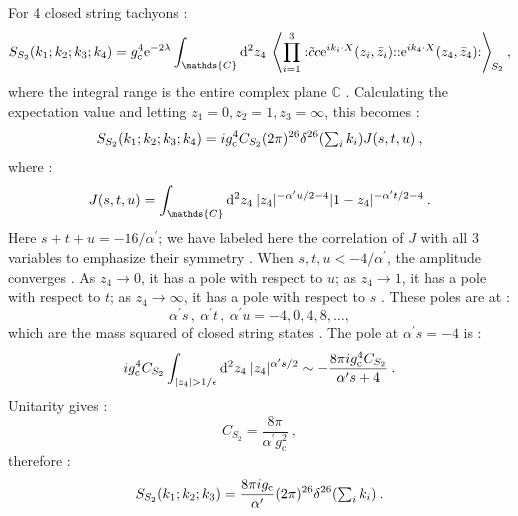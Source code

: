 For 4 closed string tachyons :
\begin{equation}
	S_{S_{2}}(k_{1} ; k_{2} ; k_{3} ; k_{4})=g_{\mathrm{c}}^{4} \me^{-2 \lambda} 
	\int_{\mathds{C}} \dif^{2} z_{4} \: \left\langle\prod_{i=1}^{3}
	: \mathrel{\tilde{c} c \me^{\mi k_{i} \cdot X}(z_{i}, \bar{z}_{i})}:
	: \mathrel{\me^{\mi k_{4} \cdot X}(z_{4}, \bar{z}_{4})}:\right\rangle\bigg._{\!\!S_{2}} \:, \label{6.6.3}
\end{equation}
where the integral range is the entire complex plane $\mathds{C}$ . Calculating the expectation value and letting $z_{1}=0, z_{2}=1, z_{3}=\infty$, this becomes :
\begin{equation}
	S_{S_{2}}(k_{1} ; k_{2} ; k_{3} ; k_{4}) = 
	i g_{\mathrm{c}}^{4} C_{S_{2}}(2 \pi)^{26} \delta^{26}({\textstyle\sum_{i} k_{i}}) J(s, t, u) \:, \label{6.6.4}
\end{equation}
where :
\begin{equation}
	J(s, t, u)=\int_{\mathds{C}} \dif^{2} z_{4}\: |z_{4}|^{-\alpha^{\prime} u / 2-4}|1-z_{4}|^{-\alpha^{\prime} t/2-4}\:. \label{6.6.5}
\end{equation}
Here $s+t+u=-16 / \alpha^{\prime}$; we have labeled here the correlation of $J$ with all 3 variables to emphasize their symmetry . When $s, t, u<-4 / \alpha^{\prime}$, the amplitude converges . As $z_{4} \rightarrow 0$, it has a pole with respect to $u$; as $z_{4} \rightarrow 1$, it has a pole with respect to $t$; as $z_{4} \rightarrow \infty$, it has a pole with respect to $s$ . These poles are at :
\begin{equation}
	\alpha^{\prime} s\,,\: \alpha^{\prime} t \,,\: \alpha^{\prime} u=-4,0,4,8, \ldots,\label{6.6.6}
\end{equation}
which are the mass squared of closed string states . The pole at $\alpha^{\prime} s=-4$ is :
\begin{equation}
	\mi g_{\mathrm{c}}^{4} C_{S_{2}} \int_{|z_{4}|>1 / \epsilon} \dif^{2} z_{4}\: |z_{4}|^{\alpha^{\prime} s / 2} 
	\sim-\frac{8 \pi \mi g_{\mathrm{c}}^{4} C_{S_{2}}}{\alpha^{\prime} s+4} \:. \label{6.6.7}
\end{equation}
Unitarity gives :
\begin{equation}
	C_{S_{2}}=\frac{8 \pi}{\alpha^{\prime} g_{\mathrm{c}}^{2}} \:, \label{6.6.8}
\end{equation}
therefore :
\begin{equation}
	S_{S_{2}}(k_{1} ; k_{2} ; k_{3})=\frac{8 \pi i g_{\mathrm{c}}}{\alpha^{\prime}}(2 \pi)^{26} 
	\delta^{26}({\textstyle\sum_{i} k_{i}}) \:. \label{6.6.9}
\end{equation}

